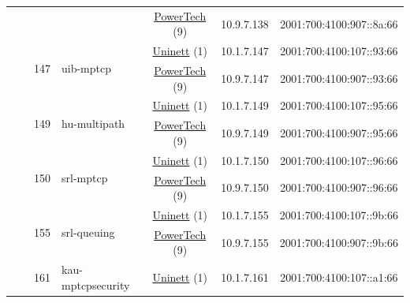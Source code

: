 \begin{small}
\begin{center}
\begin{longtable}{|c|c|c|c|c|c|c|c|}
  &  &  &  & \multicolumn{2}{|c|}{\tiny{\href{http://www.powertech.no}{PowerTech} (9)}} & \tiny{10.9.7.138} & \tiny{2001:700:4100:907::8a:66} \\* \cline{3-3}\cline{4-4}\cline{5-5}\cline{6-6}\cline{7-7}\cline{8-8}
  &  & \multirow{2}{*}{\tiny{147}} & \multicolumn{1}{|l|}{\multirow{2}{*}{\tiny{uib-mptcp}}} & \multicolumn{2}{|c|}{\tiny{\href{https://www.uninett.no}{Uninett} (1)}} & \tiny{10.1.7.147} & \tiny{2001:700:4100:107::93:66} \\* \cline{5-5}\cline{6-6}\cline{7-7}\cline{8-8}
  &  &  &  & \multicolumn{2}{|c|}{\tiny{\href{http://www.powertech.no}{PowerTech} (9)}} & \tiny{10.9.7.147} & \tiny{2001:700:4100:907::93:66} \\* \cline{3-3}\cline{4-4}\cline{5-5}\cline{6-6}\cline{7-7}\cline{8-8}
  &  & \multirow{2}{*}{\tiny{149}} & \multicolumn{1}{|l|}{\multirow{2}{*}{\tiny{hu-multipath}}} & \multicolumn{2}{|c|}{\tiny{\href{https://www.uninett.no}{Uninett} (1)}} & \tiny{10.1.7.149} & \tiny{2001:700:4100:107::95:66} \\* \cline{5-5}\cline{6-6}\cline{7-7}\cline{8-8}
  &  &  &  & \multicolumn{2}{|c|}{\tiny{\href{http://www.powertech.no}{PowerTech} (9)}} & \tiny{10.9.7.149} & \tiny{2001:700:4100:907::95:66} \\* \cline{3-3}\cline{4-4}\cline{5-5}\cline{6-6}\cline{7-7}\cline{8-8}
  &  & \multirow{2}{*}{\tiny{150}} & \multicolumn{1}{|l|}{\multirow{2}{*}{\tiny{srl-mptcp}}} & \multicolumn{2}{|c|}{\tiny{\href{https://www.uninett.no}{Uninett} (1)}} & \tiny{10.1.7.150} & \tiny{2001:700:4100:107::96:66} \\* \cline{5-5}\cline{6-6}\cline{7-7}\cline{8-8}
  &  &  &  & \multicolumn{2}{|c|}{\tiny{\href{http://www.powertech.no}{PowerTech} (9)}} & \tiny{10.9.7.150} & \tiny{2001:700:4100:907::96:66} \\* \cline{3-3}\cline{4-4}\cline{5-5}\cline{6-6}\cline{7-7}\cline{8-8}
  &  & \multirow{2}{*}{\tiny{155}} & \multicolumn{1}{|l|}{\multirow{2}{*}{\tiny{srl-queuing}}} & \multicolumn{2}{|c|}{\tiny{\href{https://www.uninett.no}{Uninett} (1)}} & \tiny{10.1.7.155} & \tiny{2001:700:4100:107::9b:66} \\* \cline{5-5}\cline{6-6}\cline{7-7}\cline{8-8}
  &  &  &  & \multicolumn{2}{|c|}{\tiny{\href{http://www.powertech.no}{PowerTech} (9)}} & \tiny{10.9.7.155} & \tiny{2001:700:4100:907::9b:66} \\* \cline{3-3}\cline{4-4}\cline{5-5}\cline{6-6}\cline{7-7}\cline{8-8}
  &  & \multirow{2}{*}{\tiny{161}} & \multicolumn{1}{|l|}{\multirow{2}{*}{\tiny{kau-mptcpsecurity}}} & \multicolumn{2}{|c|}{\tiny{\href{https://www.uninett.no}{Uninett} (1)}} & \tiny{10.1.7.161} & \tiny{2001:700:4100:107::a1:66} \\* \cline{5-5}\cline{6-6}\cline{7-7}\cline{8-8}

\end{longtable}
\end{center}
\end{small}
